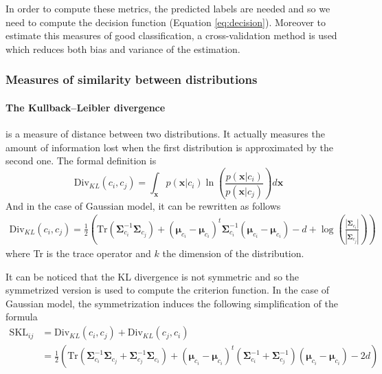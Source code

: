 \documentclass[a4paper,11pt,DIV=16]{scrartcl}
\begin{document}
        In order to compute these metrics, the predicted labels are needed and so we need to compute the decision function (Equation \ref{eq:decision}). Moreover to estimate this measures of good classification, a cross-validation method is used which reduces both bias and variance of the estimation.

        \subsubsection{Measures of similarity between distributions}

        \paragraph{The Kullback–Leibler divergence} is a measure of distance between two distributions. It actually measures the amount of information lost when the first distribution is approximated by the second one. The formal definition is
        \begin{equation}
            \text{Div}_{KL}(c_i,c_j) = \int_\mathbf{x} p(\mathbf{x}|c_i) \ln(\frac{p(\mathbf{x}|c_i)}{p(\mathbf{x}|c_j)}) d\mathbf{x}
        \end{equation}
        And in the case of Gaussian model, it can be rewritten as follows
        \begin{align}
            \text{Div}_{KL}(c_i,c_j) = \frac{1}{2} \left( \text{Tr} (\boldsymbol{\Sigma}_{c_i}^{-1} \boldsymbol{\Sigma}_{c_j}) + (\boldsymbol{\mu}_{c_i} - \boldsymbol{\mu}_{c_i})^t \boldsymbol{\Sigma}_{c_i}^{-1} (\boldsymbol{\mu}_{c_i} - \boldsymbol{\mu}_{c_i}) - d + \log \left( \frac{|\boldsymbol{\Sigma}_{c_i}|}{|\boldsymbol{\Sigma}_{c_j}|} \right) \right)
        \end{align}
        where Tr is the trace operator and $k$ the dimension of the distribution.

        It can be noticed that the KL divergence is not symmetric and so the symmetrized version is used to compute the criterion function. In the case of Gaussian model, the symmetrization induces the following simplification of the formula
        \begin{align}
            \text{SKL}_{ij} &=\text{Div}_{KL}(c_i,c_j) + \text{Div}_{KL}(c_j,c_i) \nonumber \\
            &= \frac{1}{2} \left( \text{Tr} (\boldsymbol{\Sigma}_{c_i}^{-1} \boldsymbol{\Sigma}_{c_j} + \boldsymbol{\Sigma}_{c_j}^{-1} \boldsymbol{\Sigma}_{c_i}) + (\boldsymbol{\mu}_{c_i} - \boldsymbol{\mu}_{c_i})^t (\boldsymbol{\Sigma}_{c_i}^{-1} + \boldsymbol{\Sigma}_{c_j}^{-1}) (\boldsymbol{\mu}_{c_i} - \boldsymbol{\mu}_{c_i}) - 2d \right)
        \end{align}
\end{document}
